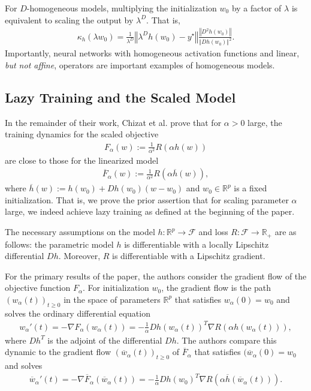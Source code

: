 \documentclass{article}
\begin{document}
For $D$-homogeneous models, multiplying the initialization $w_0$ by a factor of $\lambda$ is equivalent to scaling the output by $\lambda^D$. That is, 
\begin{align*}
    \kappa_{h}(\lambda w_0) = \frac{1}{\lambda^D} \left\Vert \lambda^D h(w_0) - y^{\star} \right\Vert \frac{\left\Vert D^2 h(w_0) \right\Vert}{\left\Vert Dh(w_0) \right\Vert^2}.
\end{align*}
Importantly, neural networks with homogeneous activation functions and linear, \textit{but not affine}, operators are important examples of homogeneous models.

\subsection{Lazy Training and the Scaled Model}
In the remainder of their work, Chizat et al. prove that for $\alpha > 0$ large, the training dynamics for the scaled objective
\begin{align*}
    F_{\alpha}(w) := \frac{1}{\alpha^2} R(\alpha h(w))
\end{align*}
are close to those for the linearized model
\begin{align*}
    \overline{F}_{\alpha}(w) := \frac{1}{\alpha^2} R(\alpha \overline{h}(w)),
\end{align*}
where $\overline{h}(w) := h(w_0) + Dh(w_0)(w - w_0)$ and $w_0 \in \mathbb{R}^p$ is a fixed initialization. That is, we prove the prior assertion that for scaling parameter $\alpha$ large, we indeed achieve lazy training as defined at the beginning of the paper. 

The necessary assumptions on the model $h: \mathbb{R}^p \rightarrow \mathcal{F}$ and loss $R: \mathcal{F} \rightarrow \mathbb{R}_+$ are as follows: the parametric model $h$ is differentiable with a locally Lipschitz differential $Dh$. Moreover, $R$ is differentiable with a Lipschitz gradient.

For the primary results of the paper, the authors consider the gradient flow of the objective function $F_{\alpha}$. For initialization $w_0$, the gradient flow is the path $(w_{\alpha}(t))_{t \geq 0}$ in the space of parameters $\mathbb{R}^p$ that satisfies $w_{\alpha}(0) = w_0$ and solves the ordinary differential equation
\begin{align*}
    w_{\alpha}'(t) = - \nabla F_{\alpha}(w_{\alpha}(t)) = - \frac{1}{\alpha} Dh(w_{\alpha}(t))^T \nabla R(\alpha h(w_{\alpha}(t))),
\end{align*}
where $Dh^T$ is the adjoint of the differential $Dh$. The authors compare this dynamic to the gradient flow $(\overline{w}_{\alpha}(t))_{t \geq 0}$ of $\overline{F}_{\alpha}$ that satisfies $(\overline{w}_{\alpha}(0) = w_0$ and solves 
\begin{align*}
    \overline{w}_{\alpha}'(t) = - \nabla \overline{F}_{\alpha}(\overline{w}_{\alpha}(t)) = - \frac{1}{\alpha} Dh(w_0)^T \nabla R(\alpha \overline{h}(\overline{w}_{\alpha}(t))).
\end{align*}
\end{document}
